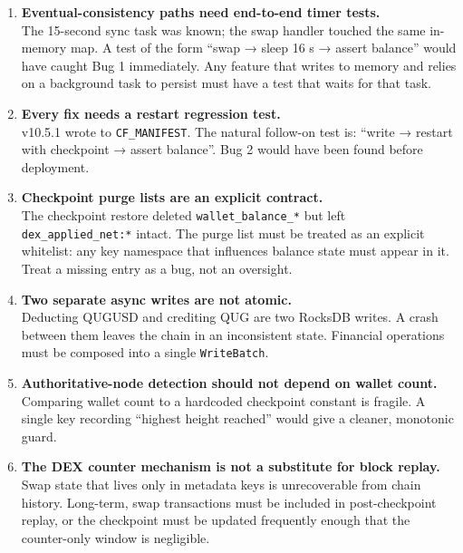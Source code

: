\documentclass[11pt,a4paper]{article}
\begin{document}
\begin{enumerate}

\item \textbf{Eventual-consistency paths need end-to-end timer tests.}\\
  The 15-second sync task was known; the swap handler touched the same
  in-memory map.  A test of the form ``swap → sleep 16 s → assert balance''
  would have caught Bug 1 immediately.  Any feature that writes to memory and
  relies on a background task to persist must have a test that waits for that
  task.

\item \textbf{Every fix needs a restart regression test.}\\
  v10.5.1 wrote to \texttt{CF\_MANIFEST}.  The natural follow-on test is:
  ``write → restart with checkpoint → assert balance''.  Bug 2 would have been
  found before deployment.

\item \textbf{Checkpoint purge lists are an explicit contract.}\\
  The checkpoint restore deleted \texttt{wallet\_balance\_*} but left
  \texttt{dex\_applied\_net:*} intact.  The purge list must be treated as an
  explicit whitelist: any key namespace that influences balance state must appear
  in it.  Treat a missing entry as a bug, not an oversight.

\item \textbf{Two separate async writes are not atomic.}\\
  Deducting QUGUSD and crediting QUG are two RocksDB writes.  A crash between
  them leaves the chain in an inconsistent state.  Financial operations must be
  composed into a single \texttt{WriteBatch}.

\item \textbf{Authoritative-node detection should not depend on wallet count.}\\
  Comparing wallet count to a hardcoded checkpoint constant is fragile.  A
  single key recording ``highest height reached'' would give a cleaner,
  monotonic guard.

\item \textbf{The DEX counter mechanism is not a substitute for block replay.}\\
  Swap state that lives only in metadata keys is unrecoverable from chain
  history.  Long-term, swap transactions must be included in post-checkpoint
  replay, or the checkpoint must be updated frequently enough that the
  counter-only window is negligible.

\end{enumerate}
\end{document}
